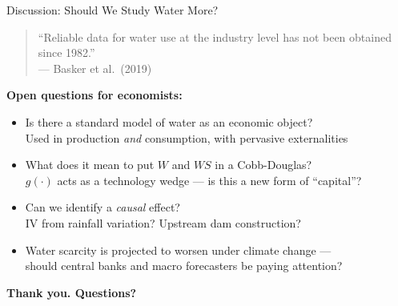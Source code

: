 \documentclass[aspectratio=169,12pt]{beamer}
\begin{document}
\begin{frame}{Discussion: Should We Study Water More?}

\vspace{0.3cm}

\begin{quote}
{\small ``Reliable data for water use at the industry level has not been obtained since 1982.''}\\
\hfill --- Basker et al.\ (2019)
\end{quote}

\vspace{0.4cm}

\textbf{Open questions for economists:}
\begin{itemize}
    \item Is there a standard model of water as an economic object?\\
    {\small Used in production \emph{and} consumption, with pervasive externalities}
    \item What does it mean to put $W$ and $WS$ in a Cobb-Douglas?\\
    {\small $g(\cdot)$ acts as a technology wedge --- is this a new form of ``capital''?}
    \item Can we identify a \emph{causal} effect?\\
    {\small IV from rainfall variation? Upstream dam construction?}
    \item Water scarcity is projected to worsen under climate change ---\\should central banks and macro forecasters be paying attention?
\end{itemize}

\vspace{0.3cm}
\centering
{\large\color{waterdark}\textbf{Thank you. Questions?}}

\end{frame}
\end{document}
